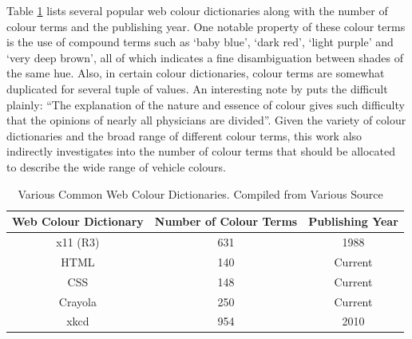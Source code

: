Table \ref{table:allcolourterms} lists several popular web colour dictionaries
along with the number of colour terms and the publishing year. One
notable property of these colour terms is the use of compound terms such as
`baby blue', `dark red', `light purple' and `very deep brown', all of which indicates a fine disambiguation between shades of the same hue.
Also, in certain colour dictionaries, colour terms are somewhat duplicated for several tuple of values. An interesting note by  puts the difficult plainly: ``The explanation of the nature and essence of colour gives such difficulty that the opinions of nearly all physicians are divided''. Given the variety of colour dictionaries and the broad range of different colour terms, this work also indirectly investigates into the number of colour terms that should be allocated to describe the wide range of vehicle colours.

\begin{table}[hbt!]
 \caption[Web Colour Dictionary and the Corresponding Number of Colour Terms]
 {Various Common Web Colour Dictionaries. Compiled from Various Source ~\cite{jaffer_2017, raveling, crayolacolor} %
 }
 \centering
 \begin{tabular}{|c|c|c|} \hline
 \multicolumn{1}{|c|}{\textbf{Web Colour Dictionary}} &
 \multicolumn{1}{c|}{\textbf{Number of Colour Terms}} &
 \multicolumn{1}{c|}{\textbf{Publishing Year}} \\ \hline x11 (R3)
 & 631                         & 1988
 \\ \hline HTML                        & 140
 & Current              \\ \hline CSS
 & 148                         & Current
 \\ \hline Crayola                       & 250
 & Current              \\ \hline xkcd
 & 954                         & 2010
 \\ \hline
 \end{tabular}
\label{table:allcolourterms}
\end{table}

